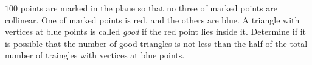 $100$ points are marked in the plane so that  no three of marked points are collinear. One of marked points is red, and the others are blue. A triangle with vertices at blue points is called \textit{good} if the red point lies inside it. Determine if it is possible that the number of good triangles is not less than the half of the total number of traingles with vertices at blue points.